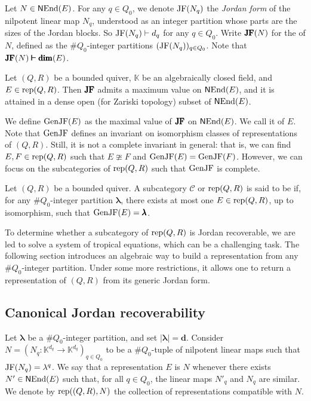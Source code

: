 Let $N \in \operatorname{\mathsf{N}End}(E)$. For any $q \in Q_0$, we denote $\operatorname{JF}(N_q)$ the \emph{Jordan form} of the nilpotent linear map $N_q$, understood as an integer partition whose parts are the sizes of the Jordan blocks. So $\operatorname{JF}(N_q) \vdash d_q$ for any $q \in Q_0$. Write $\pmb{\operatorname{JF}}(N)$ for the  of $N$, defined as the $\#Q_0$-integer partitions $(\operatorname{JF}(N_q))_{q \in Q_0}$. Note that $\pmb{\operatorname{JF}}(N) \pmb{\vdash} \operatorname{\pmb{\dim}}(E)$.

\begin{theorem} \label{thm:GenJFexists} Let $(Q,R)$ be a bounded quiver, $\mathbb{K}$ be an algebraically closed field, and $E \in \operatorname{rep}(Q,R)$. Then  $\pmb{\operatorname{JF}}$ admits a maximum value on $\operatorname{\mathsf{N}End}(E)$, and it is attained in a dense open (for Zariski topology) subset of $\operatorname{\mathsf{N}End}(E)$.
\end{theorem}

We define $\operatorname{GenJF}(E)$ as the maximal value of $\pmb{\operatorname{JF}}$ on $\operatorname{\mathsf{N}End}(E)$. We call it  of $E$. Note that $\operatorname{GenJF}$ defines an invariant on isomorphism classes of representations of $(Q,R)$. Still, it is not a complete invariant in general: that is, we can find $E,F \in \operatorname{rep}(Q,R)$ such that $E \ncong F$ and $\operatorname{GenJF}(E) = \operatorname{GenJF}(F)$. However, we can focus on the subcategories of $\operatorname{rep}(Q,R)$ such that $\operatorname{GenJF}$ is complete.

\begin{definition} \label{def:JR}
    Let $(Q,R)$ be a bounded quiver. A subcategory $\mathscr{C}$ or $\operatorname{rep}(Q,R)$ is said to be  if, for any $\#Q_0$-integer partition $\pmb{\lambda}$, there exists at most one $E \in \operatorname{rep}(Q,R)$, up to isomorphism, such that $\operatorname{GenJF}(E) = \pmb{\lambda}$.
\end{definition}

To determine whether a subcategory of $\operatorname{rep}(Q,R)$ is Jordan recoverable, we are led to solve a system of tropical equations, which can be a challenging task. The following section introduces an algebraic way to build a representation from any $\#Q_0$-integer partition. Under some more restrictions, it allows one to return a representation of $(Q,R)$ from its generic Jordan form.

\subsection{Canonical Jordan recoverability}
\label{ss:CJR}

Let $\pmb{\lambda}$ be a $\#Q_0$-integer partition, and set $|\pmb{\lambda}| = \pmb{d}$. Consider $N = \left(N_q : \mathbb{K}^{d_q} \longrightarrow \mathbb{K}^{d_q} \right)_{q \in Q_0}$ to be a $\#Q_0$-tuple of nilpotent linear maps such that $\operatorname{JF}(N_q) = \lambda^q$. We say that a representation $E$ is  $N$ whenever there exists $N' \in \operatorname{\mathsf{N}End}(E)$ such that, for all $q \in Q_0$, the linear maps $N'_q$ and $N_q$ are similar. We denote by $\operatorname{rep}((Q,R),N)$ the collection of representations compatible with $N$.

